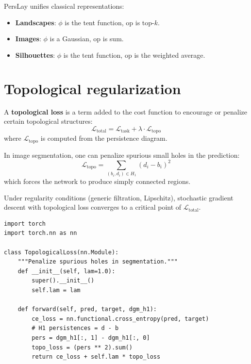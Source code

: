 \begin{remark}
PersLay unifies classical representations:
\begin{itemize}
  \item \textbf{Landscapes}: $\phi$ is the tent function,
        $\mathrm{op}$ is top-$k$.
  \item \textbf{Images}: $\phi$ is a Gaussian,
        $\mathrm{op}$ is sum.
  \item \textbf{Silhouettes}: $\phi$ is the tent function,
        $\mathrm{op}$ is the weighted average.
\end{itemize}
\end{remark}

\section{Topological regularization}
\label{sec:regularization}

\begin{definition}
A \textbf{topological loss} is a term added to the cost function
to encourage or penalize certain topological structures:
\[
  \mathcal{L}_{\mathrm{total}} = \mathcal{L}_{\mathrm{task}}
  + \lambda \cdot \mathcal{L}_{\mathrm{topo}}
\]
where $\mathcal{L}_{\mathrm{topo}}$ is computed from the persistence
diagram.
\end{definition}

\begin{example}
In image segmentation, one can penalize spurious small holes in the
prediction:
\[
  \mathcal{L}_{\mathrm{topo}} = \sum_{(b_i, d_i) \in H_1}
  (d_i - b_i)^2
\]
which forces the network to produce simply connected regions.
\end{example}

\begin{theorem}
Under regularity conditions (generic filtration, Lipschitz),
stochastic gradient descent with topological loss converges to a
critical point of $\mathcal{L}_{\mathrm{total}}$.
\end{theorem}

\begin{verbatim}
import torch
import torch.nn as nn

class TopologicalLoss(nn.Module):
    """Penalize spurious holes in segmentation."""
    def __init__(self, lam=1.0):
        super().__init__()
        self.lam = lam

    def forward(self, pred, target, dgm_h1):
        ce_loss = nn.functional.cross_entropy(pred, target)
        # H1 persistences = d - b
        pers = dgm_h1[:, 1] - dgm_h1[:, 0]
        topo_loss = (pers ** 2).sum()
        return ce_loss + self.lam * topo_loss
\end{verbatim}


